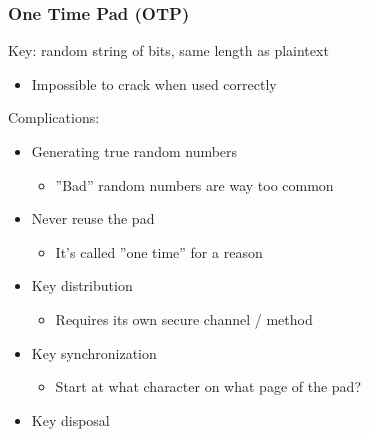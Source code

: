 \subsubsection{One Time Pad (OTP)}
Key: random string of bits, same length as plaintext
\begin{itemize}
  \item Impossible to crack when used correctly
\end{itemize}

Complications:
\begin{itemize}
  \item Generating true random numbers
        \begin{itemize}
          \item ''Bad'' random numbers are way too common
        \end{itemize}
  \item Never reuse the pad
        \begin{itemize}
          \item It's called ''one time'' for a reason
        \end{itemize}
  \item Key distribution
        \begin{itemize}
          \item Requires its own secure channel / method
        \end{itemize}
  \item Key synchronization
        \begin{itemize}
          \item Start at what character on what page of the pad?
        \end{itemize}
  \item Key disposal
\end{itemize}

